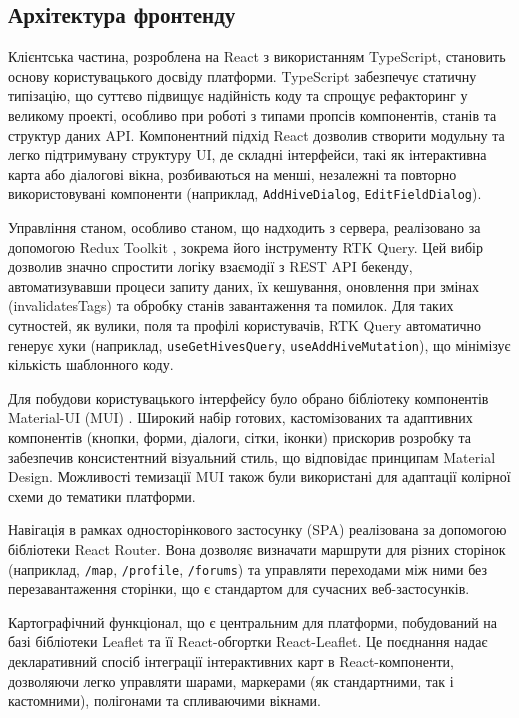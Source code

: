 \subsection{Архітектура фронтенду}
Клієнтська частина, розроблена на React \cite{react} з використанням TypeScript, становить основу користувацького досвіду платформи. TypeScript забезпечує статичну типізацію, що суттєво підвищує надійність коду та спрощує рефакторинг у великому проекті, особливо при роботі з типами пропсів компонентів, станів та структур даних API. Компонентний підхід React дозволив створити модульну та легко підтримувану структуру UI, де складні інтерфейси, такі як інтерактивна карта або діалогові вікна, розбиваються на менші, незалежні та повторно використовувані компоненти (наприклад, \texttt{AddHiveDialog}, \texttt{EditFieldDialog}).

Управління станом, особливо станом, що надходить з сервера, реалізовано за допомогою Redux Toolkit \cite{reduxtoolkit}, зокрема його інструменту RTK Query. Цей вибір дозволив значно спростити логіку взаємодії з REST API бекенду, автоматизувавши процеси запиту даних, їх кешування, оновлення при змінах (invalidatesTags) та обробку станів завантаження та помилок. Для таких сутностей, як вулики, поля та профілі користувачів, RTK Query автоматично генерує хуки (наприклад, \texttt{useGetHivesQuery}, \texttt{useAddHiveMutation}), що мінімізує кількість шаблонного коду.

Для побудови користувацького інтерфейсу було обрано бібліотеку компонентів Material-UI (MUI) \cite{materialui}. Широкий набір готових, кастомізованих та адаптивних компонентів (кнопки, форми, діалоги, сітки, іконки) прискорив розробку та забезпечив консистентний візуальний стиль, що відповідає принципам Material Design. Можливості темизації MUI також були використані для адаптації колірної схеми до тематики платформи.

Навігація в рамках односторінкового застосунку (SPA) реалізована за допомогою бібліотеки React Router. Вона дозволяє визначати маршрути для різних сторінок (наприклад, \texttt{/map}, \texttt{/profile}, \texttt{/forums}) та управляти переходами між ними без перезавантаження сторінки, що є стандартом для сучасних веб-застосунків.

Картографічний функціонал, що є центральним для платформи, побудований на базі бібліотеки Leaflet \cite{leaflet} та її React-обгортки React-Leaflet. Це поєднання надає декларативний спосіб інтеграції інтерактивних карт в React-компоненти, дозволяючи легко управляти шарами, маркерами (як стандартними, так і кастомними), полігонами та спливаючими вікнами.

